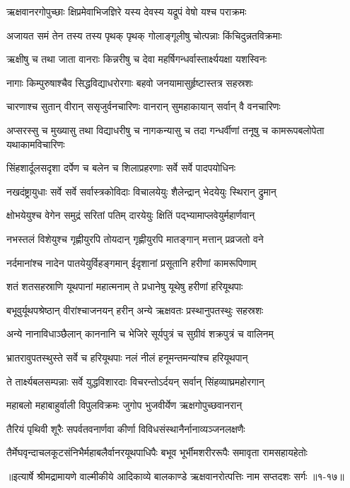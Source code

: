 \twolineshloka
{ऋक्षवानरगोपुच्छाः क्षिप्रमेवाभिजज्ञिरे}
{यस्य देवस्य यद्रूपं वेषो यश्च पराक्रमः} %

\twolineshloka
{अजायत समं तेन तस्य तस्य पृथक् पृथक्}
{गोलाङ्गूलीषु चोत्पन्नाः किंचिदुन्नतविक्रमाः} %

\twolineshloka
{ऋक्षीषु च तथा जाता वानराः किन्नरीषु च}
{देवा महर्षिगन्धर्वास्तार्क्ष्ययक्षा यशस्विनः} %

\twolineshloka
{नागाः किम्पुरुषाश्चैव सिद्धविद्याधरोरगाः}
{बहवो जनयामासुर्हृष्टास्तत्र सहस्रशः} %

\twolineshloka
{चारणाश्च सुतान् वीरान् ससृजुर्वनचारिणः}
{वानरान् सुमहाकायान् सर्वान् वै वनचारिणः} %

\threelineshloka
{अप्सरस्सु च मुख्यासु तथा विद्याधरीषु च}
{नागकन्यासु च तदा गन्धर्वीणां तनूषु च}
{कामरूपबलोपेता यथाकामविचारिणः} %

\twolineshloka
{सिंहशार्दूलसदृशा दर्पेण च बलेन च}
{शिलाप्रहरणाः सर्वे सर्वे पादपयोधिनः} %

\twolineshloka
{नखदंष्ट्रायुधाः सर्वे सर्वे सर्वास्त्रकोविदाः}
{विचालयेयुः शैलेन्द्रान् भेदयेयुः स्थिरान् द्रुमान्} %

\twolineshloka
{क्षोभयेयुश्च वेगेन समुद्रं सरितां पतिम्}
{दारयेयुः क्षितिं पद्भ्यामाप्लवेयुर्महार्णवान्} %

\twolineshloka
{नभस्तलं विशेयुश्च गृह्णीयुरपि तोयदान्}
{गृह्णीयुरपि मातङ्गान् मत्तान् प्रव्रजतो वने} %

\twolineshloka
{नर्दमानांश्च नादेन पातयेयुर्विहङ्गमान्}
{ईदृशानां प्रसूतानि हरीणां कामरूपिणाम्} %

\twolineshloka
{शतं शतसहस्राणि यूथपानां महात्मनाम्}
{ते प्रधानेषु यूथेषु हरीणां हरियूथपाः} %

\twolineshloka
{बभूवुर्यूथपश्रेष्ठान् वीरांश्चाजनयन् हरीन्}
{अन्ये ऋक्षवतः प्रस्थानुपतस्थुः सहस्रशः} %

\twolineshloka
{अन्ये नानाविधाञ्छैलान् काननानि च भेजिरे}
{सूर्यपुत्रं च सुग्रीवं शक्रपुत्रं च वालिनम्} %

\twolineshloka
{भ्रातरावुपतस्थुस्ते सर्वे च हरियूथपाः}
{नलं नीलं हनूमन्तमन्यांश्च हरियूथपान्} %

\twolineshloka
{ते तार्क्ष्यबलसम्पन्नाः सर्वे युद्धविशारदाः}
{विचरन्तोऽर्दयन् सर्वान् सिंहव्याघ्रमहोरगान्} %

\twolineshloka
{महाबलो महाबाहुर्वाली विपुलविक्रमः}
{जुगोप भुजवीर्येण ऋक्षगोपुच्छवानरान्} %

\twolineshloka
{तैरियं पृथिवी शूरैः सपर्वतवनार्णवा}
{कीर्णा विविधसंस्थानैर्नानाव्यञ्जनलक्षणैः} %

\twolineshloka
{तैर्मेघवृन्दाचलकूटसंनिभैर्महाबलैर्वानरयूथपाधिपैः}
{बभूव भूर्भीमशरीररूपैः समावृता रामसहायहेतोः} %


॥इत्यार्षे श्रीमद्रामायणे वाल्मीकीये आदिकाव्ये बालकाण्डे ऋक्षवानरोत्पत्तिः नाम सप्तदशः सर्गः ॥१-१७॥
